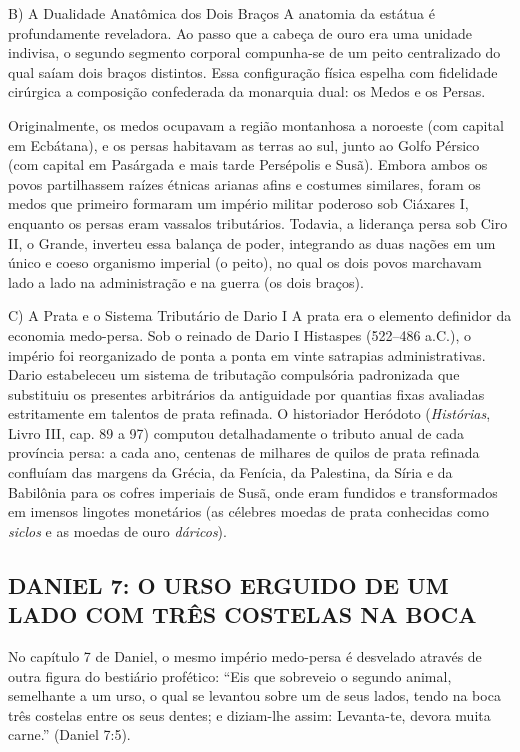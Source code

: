 \documentclass[11pt,a4paper,openany]{book}
\begin{document}
B) A Dualidade Anatômica dos Dois Braços
A anatomia da estátua é profundamente reveladora. Ao passo que a cabeça de ouro era uma unidade indivisa, o segundo segmento corporal compunha-se de um peito centralizado do qual saíam dois braços distintos. Essa configuração física espelha com fidelidade cirúrgica a composição confederada da monarquia dual: os Medos e os Persas.

Originalmente, os medos ocupavam a região montanhosa a noroeste (com capital em Ecbátana), e os persas habitavam as terras ao sul, junto ao Golfo Pérsico (com capital em Pasárgada e mais tarde Persépolis e Susã). Embora ambos os povos partilhassem raízes étnicas arianas afins e costumes similares, foram os medos que primeiro formaram um império militar poderoso sob Ciáxares I, enquanto os persas eram vassalos tributários. Todavia, a liderança persa sob Ciro II, o Grande, inverteu essa balança de poder, integrando as duas nações em um único e coeso organismo imperial (o peito), no qual os dois povos marchavam lado a lado na administração e na guerra (os dois braços).

C) A Prata e o Sistema Tributário de Dario I
A prata era o elemento definidor da economia medo-persa. Sob o reinado de Dario I Histaspes (522–486 a.C.), o império foi reorganizado de ponta a ponta em vinte satrapias administrativas. Dario estabeleceu um sistema de tributação compulsória padronizada que substituiu os presentes arbitrários da antiguidade por quantias fixas avaliadas estritamente em talentos de prata refinada. O historiador Heródoto (\textit{Histórias}, Livro III, cap. 89 a 97) computou detalhadamente o tributo anual de cada província persa: a cada ano, centenas de milhares de quilos de prata refinada confluíam das margens da Grécia, da Fenícia, da Palestina, da Síria e da Babilônia para os cofres imperiais de Susã, onde eram fundidos e transformados em imensos lingotes monetários (as célebres moedas de prata conhecidas como \textit{siclos} e as moedas de ouro \textit{dáricos}).



\subsection{DANIEL 7: O URSO ERGUIDO DE UM LADO COM TRÊS COSTELAS NA BOCA}


No capítulo 7 de Daniel, o mesmo império medo-persa é desvelado através de outra figura do bestiário profético:
``Eis que sobreveio o segundo animal, semelhante a um urso, o qual se levantou sobre um de seus lados, tendo na boca três costelas entre os seus dentes; e diziam-lhe assim: Levanta-te, devora muita carne.'' (Daniel 7:5).
\end{document}
